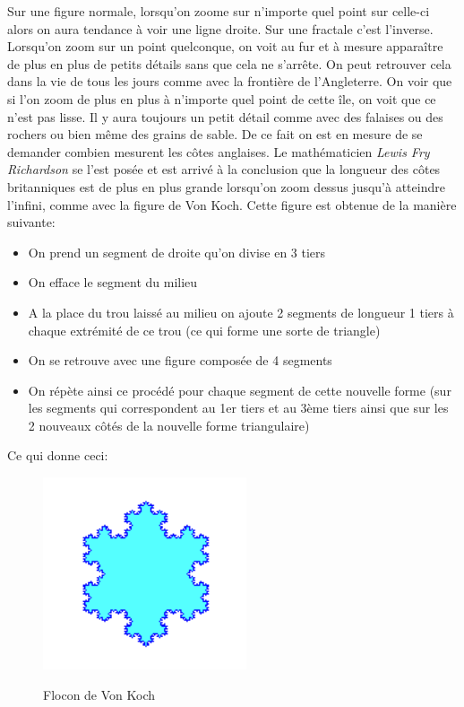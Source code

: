 \documentclass[french,11pt]{report}
\begin{document}
Sur une figure normale, lorsqu’on zoome sur n’importe quel point sur celle-ci alors on aura tendance à voir une ligne droite. Sur une fractale c’est l’inverse. Lorsqu’on zoom sur un point quelconque, on voit au fur et à mesure apparaître de plus en plus de petits détails sans que cela ne s’arrête. On peut retrouver cela dans la vie de tous les jours comme avec la frontière de l’Angleterre. On voir que si l’on zoom de plus en plus à n’importe quel point de cette île, on voit que ce n’est pas lisse. Il y aura toujours un petit détail comme avec des falaises ou des rochers ou bien même des grains de sable. De ce fait on est en mesure de se demander combien mesurent les côtes anglaises. Le mathématicien \textit{Lewis Fry Richardson} se l’est posée et est arrivé à la conclusion que la longueur des côtes britanniques est de plus en plus grande lorsqu’on zoom dessus jusqu’à atteindre l’infini, comme avec la figure de Von Koch.
Cette figure est obtenue de la manière suivante:
\begin{itemize}
    \item On prend un segment de droite qu’on divise en 3 tiers
    \item On efface le segment du milieu
    \item A la place du trou laissé au milieu on ajoute 2 segments de longueur 1 tiers à chaque extrémité de ce trou (ce qui forme une sorte de triangle)
    \item On se retrouve avec une figure composée de 4 segments
    \item On répète ainsi ce procédé pour chaque segment de cette nouvelle forme (sur les segments qui correspondent au 1er tiers et au 3ème tiers ainsi que sur les 2 nouveaux côtés de la nouvelle forme triangulaire)
\end{itemize}

\vspace*{10mm}
Ce qui donne ceci: 
\vspace*{20mm}
\begin{figure} [!h]
    \centering
    \includegraphics[width=6cm]{flocon}
    \label{fig:flocon}
    \caption{Flocon de Von Koch}
\end{figure}
\end{document}
